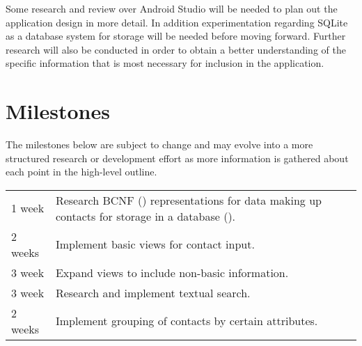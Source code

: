 \documentclass[man, 11pt, a4paper, biblatex]{apa6}
\begin{document}
  Some research and review over Android Studio will be needed to plan out the application design in more detail. In addition experimentation regarding SQLite as a database system for storage will be needed before moving forward. Further research will also be conducted in order to obtain a better understanding of the specific information that is most necessary for inclusion in the application.


  \pagebreak

  \section{Milestones}

  The milestones below are subject to change and may evolve into a more structured research or development effort as more information is gathered about each point in the high-level outline.

  \begin{tabular}{l|p{4in}}
    1 week & Research BCNF (\cite{bcnf}) representations for data making up contacts for storage in a database (\cite{sqlite}).\\
    2 weeks & Implement basic views for contact input.\\
    3 week & Expand views to include non-basic information.\\
    3 week & Research and implement textual search.\\
    2 weeks & Implement grouping of contacts by certain attributes.\\
  \end{tabular}

  \nocite{*}\printbibliography
\end{document}
